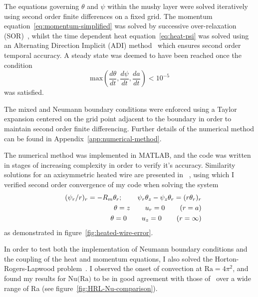 \documentclass[11pt]{proc}
\begin{document}
The equations governing $\theta$ and $\psi$ within the mushy layer were solved iteratively using second order finite differences on a fixed grid. The momentum equation~\eqref{eq:momentum-simplified} was solved by successive over-relaxation (SOR)~\citep*{young-50}, whilst the time dependent heat equation~\eqref{eq:heat-psi} was solved using an Alternating Direction Implicit (ADI) method~\citep*{peaceman-rachford-55} which ensures second order temporal accuracy. A steady state was deemed to have been reached once the condition
\begin{equation}
\text{max}\left( \frac{d\theta}{dt}, \frac{d\psi}{dt}, \frac{d a}{dt} \right) < 10^{-5}
\end{equation}
was satisfied.

The mixed and Neumann boundary conditions were enforced using a Taylor expansion centered on the grid point adjacent to the boundary in order to maintain second order finite differencing. Further details of the numerical method can be found in Appendix~\autoref{app:numerical-method}.

The numerical method was implemented in MATLAB, and the code was written in stages of increasing complexity in order to verify it's accuracy. Similarity solutions for an axisymmetric heated wire are presented in ~\citet*[Chapter~5.9]{nield-bejan-06}, using which I verified second order convergence of my code when solving the system
\begin{eqnarray}
&&(\psi_r/r)_r = -R_m \theta_r; \hspace{5ex} \psi_r \theta_z - \psi_z \theta_r = (r \theta_r)_r \\
&&\theta = z \hspace{5ex} u_r = 0 \hspace{5ex} (r=a) \\
&&\theta = 0 \hspace{5ex} u_z = 0 \hspace{5ex} (r=\infty)
\end{eqnarray}
as demonstrated in figure~\ref{fig:heated-wire-error}.

In order to test both the implementation of Neumann boundary conditions and the coupling of the heat and momentum equations, I also solved the Horton-Rogers-Lapwood problem~\citep*{horton-rogers-45,lapwood-48}. I observed the onset of convection at $\text{Ra} = 4 \pi^2$, and found my results for $\text{Nu(Ra)}$ to be in good agreement with those of~\citet*{caltagirone-75} over a wide range of Ra (see figure~\ref{fig:HRL-Nu-comparison}).
\end{document}
